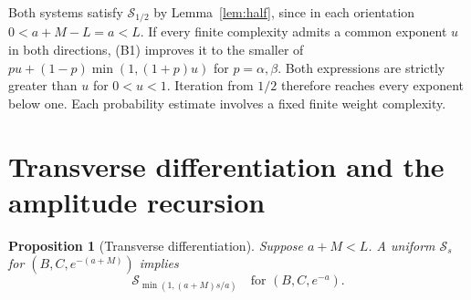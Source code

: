 \documentclass[11pt,a4paper]{article}
\newtheorem{proposition}[theorem]{Proposition}
\begin{document}
Both systems satisfy $\mathcal S_{1/2}$ by Lemma~\ref{lem:half},
since in each orientation $0<a+M-L=a<L$. If every finite
complexity admits a common exponent $u$ in both directions, (B1)
improves it to the smaller of
$p u+(1-p)\min(1,(1+p)u)$ for $p=\alpha,\beta$.
Both expressions are strictly greater than $u$ for $0<u<1$.
Iteration from $1/2$ therefore reaches every exponent below one.
Each probability estimate involves a fixed finite weight complexity.

\section{Transverse differentiation and the amplitude recursion}\label{sec:descent}
\begin{proposition}[Transverse differentiation]\label{prop:descent}
Suppose $a+M<L$. A uniform
$\mathcal S_s$ for $(B,C,e^{-(a+M)})$ implies
\[
 \mathcal S_{\min(1,(a+M)s/a)}\quad\text{for }(B,C,e^{-a}).       \tag{D}\label{eq:descent}
\]
\end{proposition}
\end{document}
